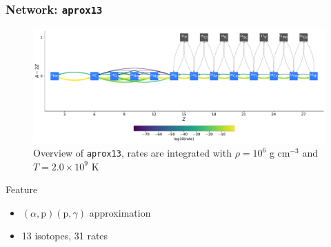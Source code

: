 \documentclass[
	11pt, %
]{beamer}
\begin{document}
\begin{frame}
\frametitle{Network: {\tt aprox13}}
        
    \begin{figure}
        \centering
        \includegraphics[width=1\linewidth]{aprox13.pdf}
        \caption{\scriptsize Overview of {\tt aprox13}, rates are integrated with $\rho = 10^6$ g $\mathrm{cm}^{-3}$ and $T = 2.0 \times 10^9$ K}
    \end{figure}
    \begin{block}{Feature}
        \begin{itemize}
            \item $(\alpha, \mbox{p})(\mbox{p}, \gamma)$ approximation
            \item 13 isotopes, 31 rates
        \end{itemize}
    \end{block}

\end{frame}
\end{document}
